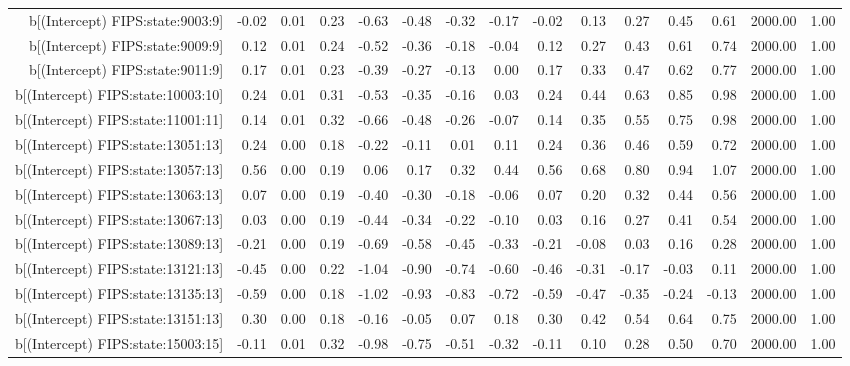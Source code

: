 \begin{table}[ht]
\begin{tabular}{rrrrrrrrrrrrrrr}
  b[(Intercept) FIPS:state:9003:9] & -0.02 & 0.01 & 0.23 & -0.63 & -0.48 & -0.32 & -0.17 & -0.02 & 0.13 & 0.27 & 0.45 & 0.61 & 2000.00 & 1.00 \\ 
  b[(Intercept) FIPS:state:9009:9] & 0.12 & 0.01 & 0.24 & -0.52 & -0.36 & -0.18 & -0.04 & 0.12 & 0.27 & 0.43 & 0.61 & 0.74 & 2000.00 & 1.00 \\ 
  b[(Intercept) FIPS:state:9011:9] & 0.17 & 0.01 & 0.23 & -0.39 & -0.27 & -0.13 & 0.00 & 0.17 & 0.33 & 0.47 & 0.62 & 0.77 & 2000.00 & 1.00 \\ 
  b[(Intercept) FIPS:state:10003:10] & 0.24 & 0.01 & 0.31 & -0.53 & -0.35 & -0.16 & 0.03 & 0.24 & 0.44 & 0.63 & 0.85 & 0.98 & 2000.00 & 1.00 \\ 
  b[(Intercept) FIPS:state:11001:11] & 0.14 & 0.01 & 0.32 & -0.66 & -0.48 & -0.26 & -0.07 & 0.14 & 0.35 & 0.55 & 0.75 & 0.98 & 2000.00 & 1.00 \\ 
  b[(Intercept) FIPS:state:13051:13] & 0.24 & 0.00 & 0.18 & -0.22 & -0.11 & 0.01 & 0.11 & 0.24 & 0.36 & 0.46 & 0.59 & 0.72 & 2000.00 & 1.00 \\ 
  b[(Intercept) FIPS:state:13057:13] & 0.56 & 0.00 & 0.19 & 0.06 & 0.17 & 0.32 & 0.44 & 0.56 & 0.68 & 0.80 & 0.94 & 1.07 & 2000.00 & 1.00 \\ 
  b[(Intercept) FIPS:state:13063:13] & 0.07 & 0.00 & 0.19 & -0.40 & -0.30 & -0.18 & -0.06 & 0.07 & 0.20 & 0.32 & 0.44 & 0.56 & 2000.00 & 1.00 \\ 
  b[(Intercept) FIPS:state:13067:13] & 0.03 & 0.00 & 0.19 & -0.44 & -0.34 & -0.22 & -0.10 & 0.03 & 0.16 & 0.27 & 0.41 & 0.54 & 2000.00 & 1.00 \\ 
  b[(Intercept) FIPS:state:13089:13] & -0.21 & 0.00 & 0.19 & -0.69 & -0.58 & -0.45 & -0.33 & -0.21 & -0.08 & 0.03 & 0.16 & 0.28 & 2000.00 & 1.00 \\ 
  b[(Intercept) FIPS:state:13121:13] & -0.45 & 0.00 & 0.22 & -1.04 & -0.90 & -0.74 & -0.60 & -0.46 & -0.31 & -0.17 & -0.03 & 0.11 & 2000.00 & 1.00 \\ 
  b[(Intercept) FIPS:state:13135:13] & -0.59 & 0.00 & 0.18 & -1.02 & -0.93 & -0.83 & -0.72 & -0.59 & -0.47 & -0.35 & -0.24 & -0.13 & 2000.00 & 1.00 \\ 
  b[(Intercept) FIPS:state:13151:13] & 0.30 & 0.00 & 0.18 & -0.16 & -0.05 & 0.07 & 0.18 & 0.30 & 0.42 & 0.54 & 0.64 & 0.75 & 2000.00 & 1.00 \\ 
  b[(Intercept) FIPS:state:15003:15] & -0.11 & 0.01 & 0.32 & -0.98 & -0.75 & -0.51 & -0.32 & -0.11 & 0.10 & 0.28 & 0.50 & 0.70 & 2000.00 & 1.00 \\ 

\end{tabular}
\end{table}
